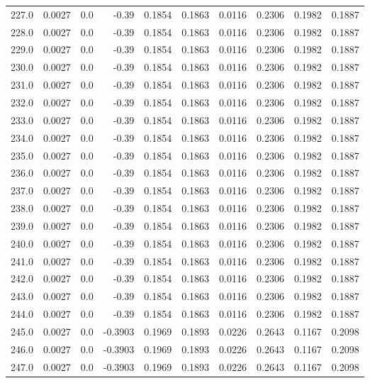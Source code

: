 \begin{longtable}{lrrrrrrrrr}
227.0 & 0.0027 & 0.0 & -0.39 & 0.1854 & 0.1863 & 0.0116 & 0.2306 & 0.1982 & 0.1887 \\
228.0 & 0.0027 & 0.0 & -0.39 & 0.1854 & 0.1863 & 0.0116 & 0.2306 & 0.1982 & 0.1887 \\
229.0 & 0.0027 & 0.0 & -0.39 & 0.1854 & 0.1863 & 0.0116 & 0.2306 & 0.1982 & 0.1887 \\
230.0 & 0.0027 & 0.0 & -0.39 & 0.1854 & 0.1863 & 0.0116 & 0.2306 & 0.1982 & 0.1887 \\
231.0 & 0.0027 & 0.0 & -0.39 & 0.1854 & 0.1863 & 0.0116 & 0.2306 & 0.1982 & 0.1887 \\
232.0 & 0.0027 & 0.0 & -0.39 & 0.1854 & 0.1863 & 0.0116 & 0.2306 & 0.1982 & 0.1887 \\
233.0 & 0.0027 & 0.0 & -0.39 & 0.1854 & 0.1863 & 0.0116 & 0.2306 & 0.1982 & 0.1887 \\
234.0 & 0.0027 & 0.0 & -0.39 & 0.1854 & 0.1863 & 0.0116 & 0.2306 & 0.1982 & 0.1887 \\
235.0 & 0.0027 & 0.0 & -0.39 & 0.1854 & 0.1863 & 0.0116 & 0.2306 & 0.1982 & 0.1887 \\
236.0 & 0.0027 & 0.0 & -0.39 & 0.1854 & 0.1863 & 0.0116 & 0.2306 & 0.1982 & 0.1887 \\
237.0 & 0.0027 & 0.0 & -0.39 & 0.1854 & 0.1863 & 0.0116 & 0.2306 & 0.1982 & 0.1887 \\
238.0 & 0.0027 & 0.0 & -0.39 & 0.1854 & 0.1863 & 0.0116 & 0.2306 & 0.1982 & 0.1887 \\
239.0 & 0.0027 & 0.0 & -0.39 & 0.1854 & 0.1863 & 0.0116 & 0.2306 & 0.1982 & 0.1887 \\
240.0 & 0.0027 & 0.0 & -0.39 & 0.1854 & 0.1863 & 0.0116 & 0.2306 & 0.1982 & 0.1887 \\
241.0 & 0.0027 & 0.0 & -0.39 & 0.1854 & 0.1863 & 0.0116 & 0.2306 & 0.1982 & 0.1887 \\
242.0 & 0.0027 & 0.0 & -0.39 & 0.1854 & 0.1863 & 0.0116 & 0.2306 & 0.1982 & 0.1887 \\
243.0 & 0.0027 & 0.0 & -0.39 & 0.1854 & 0.1863 & 0.0116 & 0.2306 & 0.1982 & 0.1887 \\
244.0 & 0.0027 & 0.0 & -0.39 & 0.1854 & 0.1863 & 0.0116 & 0.2306 & 0.1982 & 0.1887 \\
245.0 & 0.0027 & 0.0 & -0.3903 & 0.1969 & 0.1893 & 0.0226 & 0.2643 & 0.1167 & 0.2098 \\
246.0 & 0.0027 & 0.0 & -0.3903 & 0.1969 & 0.1893 & 0.0226 & 0.2643 & 0.1167 & 0.2098 \\
247.0 & 0.0027 & 0.0 & -0.3903 & 0.1969 & 0.1893 & 0.0226 & 0.2643 & 0.1167 & 0.2098 \\

\end{longtable}
